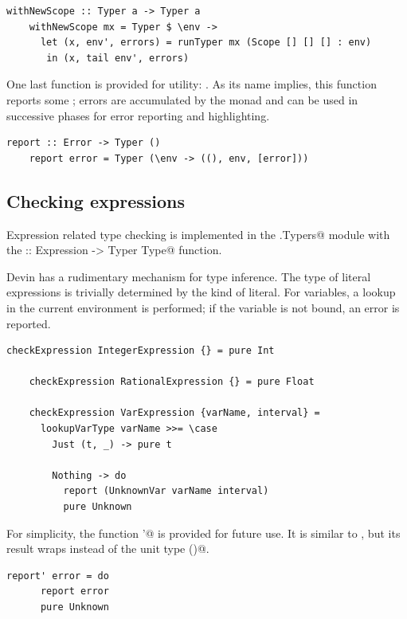 \documentclass[UdineBachThesis,american,11pt]{PhdThesis}
\begin{document}
  \begin{lstlisting}[gobble=4,basicstyle=\ttfamily\small]
    withNewScope :: Typer a -> Typer a
    withNewScope mx = Typer $ \env ->
      let (x, env', errors) = runTyper mx (Scope [] [] [] : env)
       in (x, tail env', errors)
  \end{lstlisting}

  One last function is provided for utility: \lstinline@report@. As its name
  implies, this function reports some \lstinline@Error@; errors are accumulated
  by the \lstinline@Typer@ monad and can be used in successive phases for error
  reporting and highlighting.

  \begin{lstlisting}[gobble=4,basicstyle=\ttfamily\small]
    report :: Error -> Typer ()
    report error = Typer (\env -> ((), env, [error]))
  \end{lstlisting}

  \subsection{Checking expressions}

  Expression related type checking is implemented in the
  \lstinline@Devin.Typers@ module with the
  \lstinline@checkExpression :: Expression -> Typer Type@ function.

  Devin has a rudimentary mechanism for type inference. The type of literal
  expressions is trivially determined by the kind of literal. For variables, a
  lookup in the current environment is performed; if the variable is not bound,
  an error is reported.

  \begin{lstlisting}[gobble=4,basicstyle=\ttfamily\small]
    checkExpression IntegerExpression {} = pure Int

    checkExpression RationalExpression {} = pure Float

    checkExpression VarExpression {varName, interval} =
      lookupVarType varName >>= \case
        Just (t, _) -> pure t

        Nothing -> do
          report (UnknownVar varName interval)
          pure Unknown
  \end{lstlisting}

  For simplicity, the function \lstinline@report'@ is provided for future use.
  It is similar to \lstinline@report@, but its result wraps
  \lstinline@Unknown@ instead of the unit type \lstinline@()@.

  \begin{lstlisting}[gobble=4,basicstyle=\ttfamily\small]
    report' error = do
      report error
      pure Unknown
  \end{lstlisting}
\end{document}
